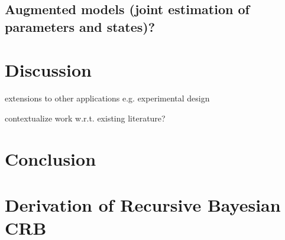 \documentclass{article}
\begin{document}
\subsection{Augmented models (joint estimation of parameters and states)?}

\section{Discussion}

extensions to other applications e.g. experimental design

contextualize work w.r.t. existing literature?

\section{Conclusion}

\appendix
\section{Derivation of Recursive Bayesian CRB}
\label{sec:derivation_recursion}
\end{document}
